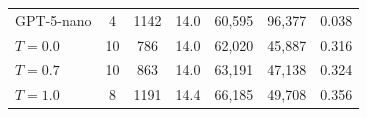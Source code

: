 \documentclass[a4paper,fleqn]{cas-sc}
\begin{document}
\begin{table}[]
{\begin{tabular}{@{}l c c c c c c@{}}
  GPT-5-nano            & 4  & 1142 & 14.0 & 60{,}595 & 96{,}377 & 0.038 \\                                                                 
  $T=0.0$               & 10 & 786  & 14.0 & 62{,}020 & 45{,}887 & 0.316 \\                                                                 
  $T=0.7$               & 10 & 863  & 14.0 & 63{,}191 & 47{,}138 & 0.324 \\                                                                 
  $T=1.0$               & 8  & 1191 & 14.4 & 66{,}185 & 49{,}708 & 0.356 \\                                                                 
  \bottomrule                                                                                                                               
  \end{tabular} 
  }
  \end{table}                                                                                                                               
                                                                                                                                            
\end{document}
